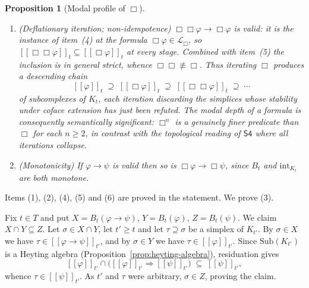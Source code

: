 \documentclass[final,12pt]{elsarticle}
\newcommand{\llbracket}{[\![}
\newcommand{\rrbracket}{]\!]}
\theoremstyle{plain}
\newtheorem{prop}[thm]{Proposition}
\theoremstyle{definition}
\begin{document}
\begin{prop}[Modal profile of \(\Box\)]
\begin{enumerate}
        \(B_t(\varphi)\subseteq B_t\bigl(B(\varphi)\bigr)\) and would validate
        \(\mathsf{4}\) on its own.  Transitivity is destroyed only by the
        interposed \(\mathrm{int}_{K_t}\), which shrinks
        \(B_t(\varphi)\) before the second coface test is applied.  Axiom
        \(\mathsf{4}\) is therefore traded for the closure under faces that
        makes \(\Box\) intuitionistically admissible. A concrete instance of this strictly descending chain is computed in Example~\ref{ex:path-vs-circle}, where the extra edge of the circle is detected precisely at the second stage \(\Box^{2}\).
  \item \emph{(Deflationary iteration; non-idempotence)}
        \(\Box\Box\varphi\to\Box\varphi\) \emph{is} valid: it is the instance of
        item~(4) at the formula \(\Box\varphi\in\mathcal{L}_\Box\), so
        \(\llbracket\Box\Box\varphi\rrbracket_t
          \subseteq\llbracket\Box\varphi\rrbracket_t\) at every stage.
        Combined with item~(5) the inclusion is in general \emph{strict}, whence
        \(\Box\Box\not\equiv\Box\).  Thus iterating \(\Box\) produces a
        descending chain
        \[
          \llbracket\varphi\rrbracket_t
          \;\supseteq\;\llbracket\Box\varphi\rrbracket_t
          \;\supseteq\;\llbracket\Box\Box\varphi\rrbracket_t
          \;\supseteq\;\cdots
        \]
        of subcomplexes of \(K_t\), each iteration discarding the simplices
        whose stability under coface extension has just been refuted.  The
        modal depth of a formula is consequently semantically significant:
        \(\Box^{n}\) is a genuinely finer predicate than \(\Box\) for each
        \(n\geq 2\), in contrast with the topological reading of \(\mathsf{S4}\)
        where all iterations collapse.
  \item \emph{(Monotonicity)} If \(\varphi\to\psi\) is valid then so is
        \(\Box\varphi\to\Box\psi\), since \(B_t\) and \(\mathrm{int}_{K_t}\)
        are both monotone.
\end{enumerate}
\end{prop}

\proof
Items (1), (2), (4), (5) and (6) are proved in the statement.  We prove (3).

Fix \(t \in T\) and put
\(X = B_t(\varphi\to\psi)\), \(Y = B_t(\varphi)\), \(Z = B_t(\psi)\).
We claim \(X \cap Y \subseteq Z\).  Let \(\sigma \in X \cap Y\), let
\(t' \geq t\) and let \(\tau \supseteq \sigma\) be a simplex of \(K_{t'}\).
By \(\sigma \in X\) we have
\(\tau \in \llbracket\varphi\to\psi\rrbracket_{t'}\), and by \(\sigma \in Y\)
we have \(\tau \in \llbracket\varphi\rrbracket_{t'}\).  Since
\(\mathrm{Sub}(K_{t'})\) is a Heyting algebra
(Proposition~\ref{prop:heyting-algebra}), residuation gives
\[
  \llbracket\varphi\rrbracket_{t'} \cap
  \bigl(\llbracket\varphi\rrbracket_{t'} \Rightarrow
        \llbracket\psi\rrbracket_{t'}\bigr)
  \;\subseteq\; \llbracket\psi\rrbracket_{t'},
\]
whence \(\tau \in \llbracket\psi\rrbracket_{t'}\).  As \(t'\) and \(\tau\)
were arbitrary, \(\sigma \in Z\), proving the claim.
\end{document}
